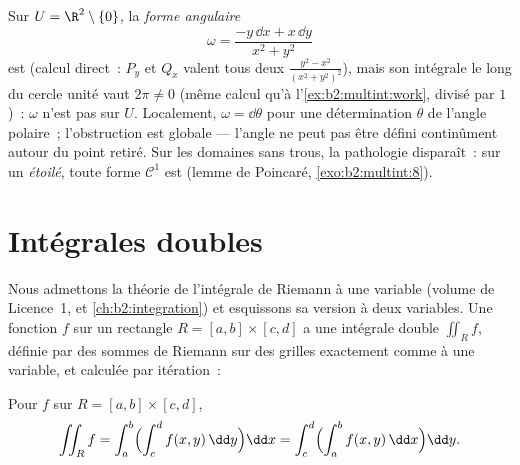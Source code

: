 \begin{example}\label{ex:b2:multint:angleform}
Sur $U = \R^2 \setminus \{0\}$, la \emph{forme angulaire}
\[
\omega = \frac{-y\,\dd x + x\,\dd y}{x^2 + y^2}
\]
est  (calcul direct~: $P_y$ et $Q_x$ valent tous deux
$\frac{y^2 - x^2}{(x^2+y^2)^2}$), mais son intégrale le long du cercle
unité vaut $2\pi \neq 0$ (même calcul qu'à l'\cref{ex:b2:multint:work},
divisé par $1$)~: $\omega$ n'est pas 
sur $U$. Localement, $\omega = \dd\theta$ pour une détermination
$\theta$ de l'angle polaire~; l'obstruction est globale --- l'angle
ne peut pas être défini continûment autour du point retiré. Sur les
domaines sans trous, la pathologie disparaît~: sur un 
\emph{étoilé}, toute forme $\mathcal{C}^1$  est 
(lemme de Poincaré, \cref{exo:b2:multint:8}).
\end{example}

\section{Intégrales doubles}

Nous admettons la théorie de l'intégrale de Riemann à une
variable (volume de Licence~1, et \cref{ch:b2:integration}) et
esquissons sa version à deux variables. Une fonction $f$  sur
un rectangle $R = [a, b] \times [c, d]$ a une intégrale double
$\iint_R f$, définie par des sommes de Riemann sur des grilles
exactement comme à une variable, et calculée par itération~:

\begin{theorem}\label{thm:b2:multint:fubini}
Pour $f$  sur $R = [a,b] \times [c,d]$,
\[
\iint_R f
= \int_a^b \Bigl(\int_c^d f(x, y)\,\dd y\Bigr)\dd x
= \int_c^d \Bigl(\int_a^b f(x, y)\,\dd x\Bigr)\dd y .
\]
\end{theorem}

